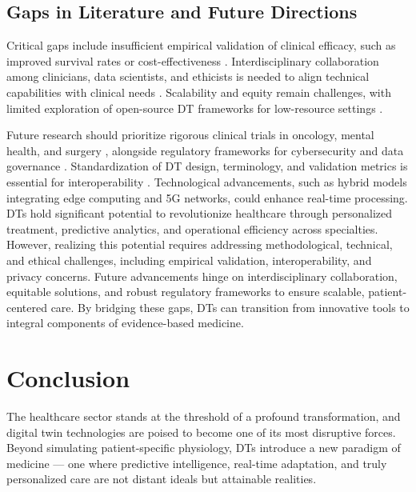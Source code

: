 \documentclass[10pt,a4paper]{article}
\begin{document}
\subsection*{Gaps in Literature and Future Directions}
Critical gaps include insufficient empirical validation of clinical efficacy, such as improved survival rates or cost-effectiveness \cite{Khater2024b}. Interdisciplinary collaboration among clinicians, data scientists, and ethicists is needed to align technical capabilities with clinical needs \cite{Venkatesh2024}. Scalability and equity remain challenges, with limited exploration of open-source DT frameworks for low-resource settings \cite{liu2019}.  

Future research should prioritize rigorous clinical trials in oncology, mental health, and surgery \cite{Vidovszky2024, Subramanian2022b}, alongside regulatory frameworks for cybersecurity and data governance \cite{Balasubramanyam2024}. Standardization of DT design, terminology, and validation metrics is essential for interoperability \cite{Venkatesh2024}. Technological advancements, such as hybrid models integrating edge computing and 5G networks, could enhance real-time processing. \\ 

DTs hold significant potential to revolutionize healthcare through personalized treatment, predictive analytics, and operational efficiency across specialties. However, realizing this potential requires addressing methodological, technical, and ethical challenges, including empirical validation, interoperability, and privacy concerns. Future advancements hinge on interdisciplinary collaboration, equitable solutions, and robust regulatory frameworks to ensure scalable, patient-centered care. By bridging these gaps, DTs can transition from innovative tools to integral components of evidence-based medicine.  

\newpage

\section{Conclusion}

The healthcare sector stands at the threshold of a profound transformation, and digital twin technologies are poised to become one of its most disruptive forces. Beyond simulating patient-specific physiology, DTs introduce a new paradigm of medicine — one where predictive intelligence, real-time adaptation, and truly personalized care are not distant ideals but attainable realities.
\end{document}
